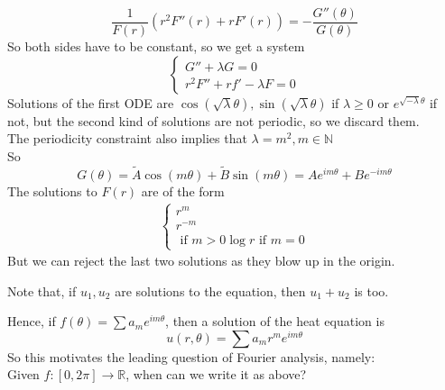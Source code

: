 \documentclass[../main.tex]{subfiles}
\begin{document}
\[ 
\frac{1}{F( r) }( r^{2} F''( r) + r F'(r) ) =- \frac{G''( \theta) }{G( \theta) }
\]
So both sides have to be constant, so we get a system
\[ 
\begin{cases}
G'' + \lambda G = 0 \\
r^{2} F'' + r f' - \lambda F = 0
\end{cases}
\]
Solutions of the first ODE are $\cos(  \sqrt{\lambda} \theta), \sin(  \sqrt{\lambda } \theta) $ if $\lambda \geq 0$ or $ e^{ \sqrt{-\lambda}  \theta} $ if not, but the second kind of solutions are not periodic, so we discard them.\\
The periodicity constraint also implies that $ \lambda = m^{2}, m \in \mathbb{N}$ \\
So 
\[ 
G( \theta) = \tilde { A} \cos( m\theta)  + \tilde { B}  \sin( m\theta)  = A e^{im\theta} + B e^{-im\theta} 
\]
The solutions to $F( r) $ are of the form
\begin{align*}
\begin{cases}
r^{m}\\
r^{-m}\\  \text{ if }  m >0
\log r \text{ if } m=0
\end{cases}
\end{align*}
But we can reject the last two solutions as they blow up in the origin.\\
\begin{rmq}
Note that, if $u_1,u_2$ are solutions to the equation, then $ u_1+ u_2$ is too.
\end{rmq}
Hence, if $f( \theta) = \sum a_m e^{im\theta} $, then a solution of the heat equation is
\[ 
u( r,\theta) = \sum a_m r^{m} e^{im\theta} 
\]
So this motivates the leading question of Fourier analysis, namely:\\
Given $f: [ 0,2\pi] \to \mathbb{R}$, when can we write it as above?





	



				




	
\end{document}
